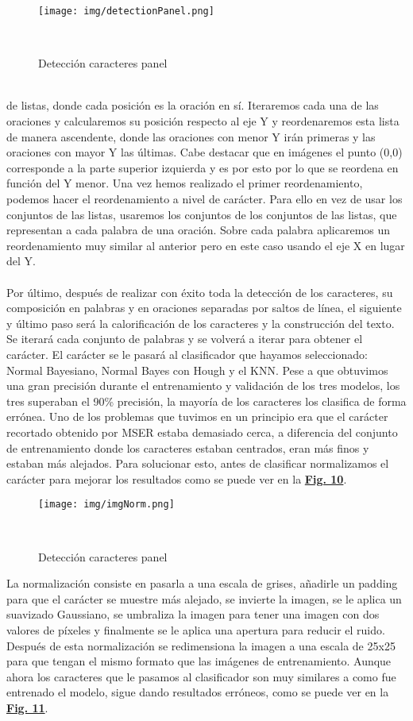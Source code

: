 \documentclass[a4paper, 12pt]{article}
\begin{document}
\begin{figure}[h]
	\centering
	\texttt{[image: img/detectionPanel.png]}
 	\caption{Detección caracteres panel}\
	\label{fig:imagenDetectada}
\end{figure}
\\de listas, donde cada posición es la oración en sí. Iteraremos cada una de las oraciones y calcularemos su posición respecto al eje Y y reordenaremos esta lista de manera ascendente, donde las oraciones con menor Y irán primeras y las oraciones con mayor Y las últimas. Cabe destacar que en imágenes el punto (0,0) corresponde a la parte superior izquierda y es por esto por lo que se reordena en función del Y menor. Una vez hemos realizado el primer reordenamiento, podemos hacer el reordenamiento a nivel de carácter. Para ello en vez de usar los conjuntos de las listas, usaremos los conjuntos de los conjuntos de las listas, que representan a cada palabra de una oración. Sobre cada palabra aplicaremos un reordenamiento muy similar al anterior pero en este caso usando el eje X en lugar del Y. 
\\\\ Por último, después de realizar con éxito toda la detección de los caracteres, su composición en palabras y en oraciones separadas por saltos de línea, el siguiente y último paso será la calorificación de los caracteres y la construcción del texto. Se iterará cada conjunto de palabras y se volverá a iterar para obtener el carácter. El carácter se le pasará al clasificador que hayamos seleccionado: Normal Bayesiano, Normal Bayes con Hough y el KNN. Pese a que obtuvimos una gran precisión durante el entrenamiento y validación de los tres modelos, los tres superaban el 90\% precisión, la mayoría de los caracteres los clasifica de forma errónea. Uno de los problemas que tuvimos en un principio era que el carácter recortado obtenido por MSER estaba demasiado cerca, a diferencia del conjunto de entrenamiento donde los caracteres estaban centrados, eran más finos y estaban más alejados. Para solucionar esto, antes de clasificar normalizamos el carácter para mejorar los resultados como se puede ver en la \textbf{\hyperref[fig:imagenDetectada]{Fig. 10}}.
\newpage
\begin{figure}[h]
	\centering
	\texttt{[image: img/imgNorm.png]}
 	\caption{Detección caracteres panel}\
	\label{fig:imagenDetectada}
\end{figure}
La normalización consiste en pasarla a una escala de grises, añadirle un padding para que el carácter se muestre más alejado, se invierte la imagen, se le aplica un suavizado Gaussiano, se umbraliza la imagen para tener una imagen con dos valores de píxeles y finalmente se le aplica una apertura para reducir el ruido. Después de esta normalización se redimensiona la imagen a una escala de 25x25 para que tengan el mismo formato que las imágenes de entrenamiento. Aunque ahora los caracteres que le pasamos al clasificador son muy similares a como fue entrenado el modelo, sigue dando resultados erróneos, como se puede ver en la \textbf{\hyperref[fig:imagenClasificada]{Fig. 11}}.
\end{document}
